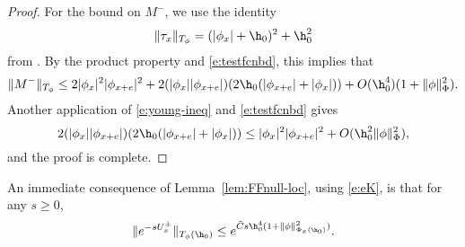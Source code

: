 \begin{proof}
For the bound on $M^-$, we use the identity
\begin{equation}
\label{e:taunorm}
\|\tau_x\|_{T_\phi}
  =
(|\phi_x| + \h_0)^2 + \h_0^2
\end{equation}
from \cite[\eqref{norm-e:taunorm}]{BS-rg-norm}.
By the product property and \eqref{e:testfcnbd}, this implies that
\begin{equation}
\|M^-\|_{T_\phi}
  \le
2 |\phi_x|^2 |\phi_{x+e}|^2
  +
2 (|\phi_x| |\phi_{x+e}|) (2 \h_0 (|\phi_{x+e}| + |\phi_x|))
  +
O(\h_0^4) (1 + \|\phi\|^2_\Phi).
\end{equation}
Another application of \eqref{e:young-ineq} and \eqref{e:testfcnbd} gives
\begin{equation}
2 (|\phi_x| |\phi_{x+e}|) (2 \h_0 (|\phi_{x+e}| + |\phi_x|))
  \le
|\phi_x|^2 |\phi_{x+e}|^2 + O(\h_0^2 \|\phi\|^2_\Phi),
\end{equation}
and the proof is complete.
\end{proof}

An immediate consequence of Lemma~\ref{lem:FFnull-loc}, using \eqref{e:eK},
is that for any $s \ge 0$,
\begin{equation}
\label{e:Itilbd}
\|e^{-s U^\pm_x}\|_{T_\phi(\h_0)} \leq e^{\tilde C s \h_0^4 (1 + \|\phi\|^2_{\Phi_x(\h_0)})}.
\end{equation}

